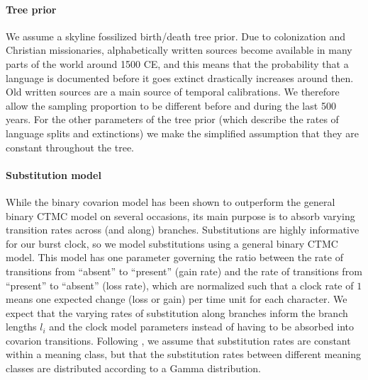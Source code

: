 \documentclass[]{rsos}%
\begin{document}
\paragraph{Tree prior}
We assume a skyline fossilized birth/death tree prior.
Due to colonization and Christian missionaries,
alphabetically written sources become available in many parts of the world around
1500 CE, and this means that the probability that a language is documented before
it goes extinct drastically increases around then. Old written sources are a
main source of temporal calibrations.
We therefore allow the sampling proportion to be different before and during the last 500 years.
For the other parameters of the tree prior (which describe the rates of language splits and extinctions) we make the simplified assumption that they are constant throughout the tree.


\paragraph{Substitution model}

While the binary covarion model has been shown to outperform the general binary CTMC
model on several occasions, its main purpose is to absorb varying transition
rates across (and along) branches. Substitutions are highly informative for our burst clock,
so we model substitutions using a general binary CTMC model.
This model has one parameter governing the ratio 
between the rate of transitions from “absent” to “present” (gain rate)
and the rate of transitions from “present” to “absent” (loss rate),
which are normalized such that a clock rate of $1$ means one expected
change (loss or gain) per time unit for each character.
We expect that the varying
rates of substitution along branches inform the branch lengths $l_i$
and the clock model parameters instead of having to be absorbed into covarion transitions.
Following \textcite{maurits2017beastling}, we assume that substitution rates are constant within a
meaning class, but that the substitution rates between different meaning classes
are distributed according to a Gamma distribution.
\end{document}
